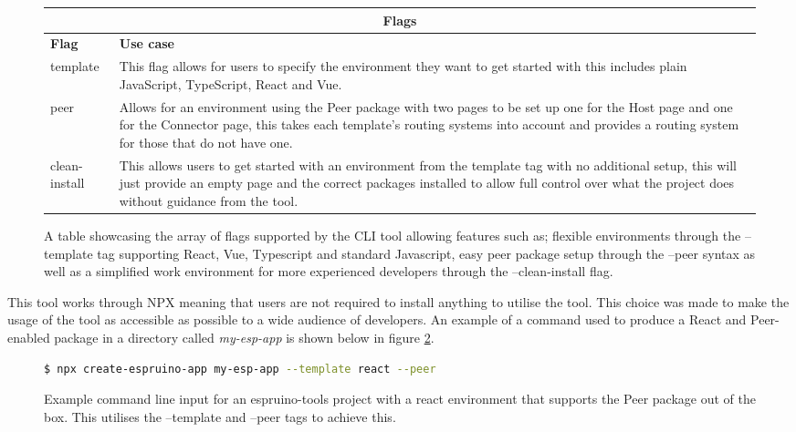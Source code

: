 \documentclass{l4proj}
\begin{document}
\begin{figure}[!ht]
    \centering
    \begin{tabular}{|p{2.25cm}|p{10cm}|}
 \hline
 \multicolumn{2}{|c|}{Flags} \\
 \hline
 \textbf{Flag}  & \textbf{Use case}\\
 \hline
 template & This flag allows for users to specify the environment they want to get started with this includes plain JavaScript, TypeScript, React and Vue.\\ \hline

 peer & Allows for an environment using the Peer package with two pages to be set up one for the Host page and one for the Connector page, this takes each template's routing systems into account and provides a routing system for those that do not have one.\\ \hline

 clean-install & This allows users to get started with an environment from the template tag with no additional setup, this will just provide an empty page and the correct packages installed to allow full control over what the project does without guidance from the tool.\\
 \hline
    \end{tabular}
    \caption{A table showcasing the array of flags supported by the CLI tool allowing features such as; flexible environments through the --template tag supporting React, Vue, Typescript and standard Javascript, easy peer package setup through the --peer syntax as well as a simplified work environment for more experienced developers through the --clean-install flag.}
    \label{fig:flag-comp}
\end{figure}

This tool works through NPX meaning that users are not required to install anything to utilise the tool. This choice was made to make the usage of the tool as accessible as possible to a wide audience of developers. An example of a command used to produce a React and Peer-enabled package in a directory called \textit{my-esp-app} is shown below in figure \ref{fig:npx-command}.

\begin{figure}[!ht]
    \centering
    \begin{lstlisting}[language=bash]
        $ npx create-espruino-app my-esp-app --template react --peer
    \end{lstlisting}
    \caption{Example command line input for an espruino-tools project with a react environment that supports the Peer package out of the box. This utilises the --template and --peer tags to achieve this.}
    \label{fig:npx-command}
\end{figure}
\end{document}
